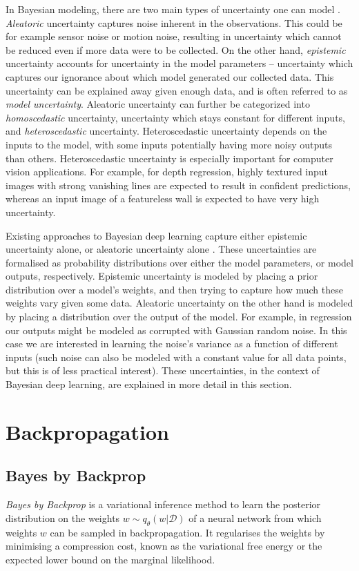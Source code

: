 In Bayesian modeling, there are two main types of uncertainty one can model \citep{der2009aleatory}. \textit{Aleatoric} uncertainty captures noise inherent in the observations.
This could be for example sensor noise or motion noise, resulting in uncertainty which cannot be reduced even if more data were to be collected.
On the other hand, \textit{epistemic} uncertainty accounts for uncertainty in the model parameters -- uncertainty which captures our ignorance about which model generated our collected data. 
This uncertainty can be explained away given enough data, and is often referred to as \textit{model uncertainty}. Aleatoric uncertainty can further be categorized into \textit{homoscedastic} uncertainty, uncertainty which stays constant for different inputs, and \textit{heteroscedastic} uncertainty. Heteroscedastic uncertainty depends on the inputs to the model, with some inputs potentially having more noisy outputs than others. 
Heteroscedastic uncertainty is especially important for computer vision applications. For example, for depth regression, highly textured input images with strong vanishing lines are expected to result in confident predictions, whereas an input image of a featureless wall is expected to have very high uncertainty.


Existing approaches to Bayesian deep learning capture either epistemic uncertainty alone, or aleatoric uncertainty alone \cite{gal2016thesis}. These uncertainties are formalised as probability distributions over either the model parameters, or model outputs, respectively. Epistemic uncertainty is modeled by placing a prior distribution over a model's weights, and then trying to capture how much these weights vary given some data. Aleatoric uncertainty on the other hand is modeled by placing a distribution over the output of the model. For example, in regression our outputs might be modeled as corrupted with Gaussian random noise. In this case we are interested in learning the noise's variance as a function of different inputs (such noise can also be modeled with a constant value for all data points, but this is of less practical interest). These uncertainties, in the context of Bayesian deep learning, are explained in more detail in this section. 

\section{Backpropagation}
\subsection{Bayes by Backprop}
\textit{Bayes by Backprop} \cite{graves2011practical, blundell2015weight} is a variational inference method to learn the posterior distribution on the weights $w \sim q_{\theta}(w|\mathcal{D})$ of a neural network from which weights $w$ can be sampled in backpropagation. 
It regularises the weights by minimising a compression cost, known as the variational free energy or the expected lower bound on the marginal likelihood.

